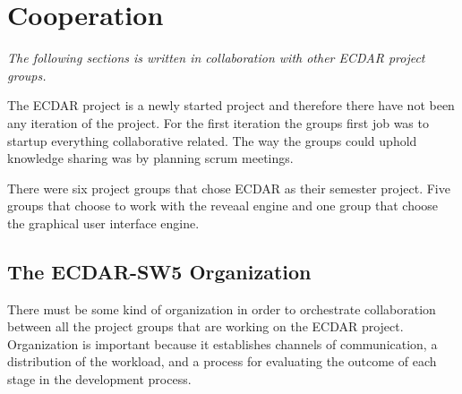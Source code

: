 \section{Cooperation}\label{Scrum/agile-cooperation}
\textit{The following sections is written in collaboration with other ECDAR project groups.}




\begin{comment}
This semester project specifically focuses on multi-project cooperation, which means that several project groups will be cooperating on the same project. In total, six project groups consisting of six members each will be cooperating to further extend ECDAR. Five of these groups will be focusing on further development of the Reveaal engine, while the last group will focus on development of the graphical user interface of ECDAR. However, all six groups....


\end{comment}




The ECDAR project is a newly started project and therefore there have not been any iteration of the project.
For the first iteration the groups first job was to startup everything collaborative related. 
The way the groups could uphold knowledge sharing was by planning scrum meetings.

There were six project groups that chose ECDAR as their semester project. 
Five groups that choose to work with the reveaal engine and one group that choose the graphical user interface engine.




\subsection{The ECDAR-SW5 Organization}
There must be some kind of organization in order to orchestrate collaboration between all the project groups that are working on the ECDAR project. 
Organization is important because it establishes channels of communication, a distribution of the workload, and a process for evaluating the outcome of each stage in the development process.

